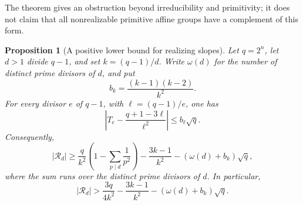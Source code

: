 \documentclass[11pt]{article}
\newtheorem{proposition}[theorem]{Proposition}
\begin{document}
The theorem gives an obstruction beyond irreducibility and
primitivity; it does not claim that all nonrealizable primitive
affine groups have a complement of this form.

\begin{proposition}[A positive lower bound for realizing slopes]
\label{prop:scalar-positive-bound}
Let $q=2^n$, let $d>1$ divide $q-1$, and set $k=(q-1)/d$.
Write $\omega(d)$ for the number of distinct prime divisors of $d$, and put
\[
 b_k=\frac{(k-1)(k-2)}{k^2}.
\]
For every divisor $e$ of $q-1$, with $\ell=(q-1)/e$, one has
\begin{equation}\label{eq:scalar-intersection-bound}
 \left|T_e-\frac{q+1-3\ell}{\ell^2}\right|
 \le b_\ell\sqrt q.
\end{equation}
Consequently,
\begin{equation}\label{eq:scalar-positive-bound}
 |\mathcal R_d|\ge
 \frac{q}{k^2}\left(1-\sum_{p\mid d}\frac1{p^2}\right)
 -\frac{3k-1}{k^2}-(\omega(d)+b_k)\sqrt q,
\end{equation}
where the sum runs over the distinct prime divisors of $d$. In particular,
\begin{equation}\label{eq:scalar-uniform-bound}
 |\mathcal R_d|>
 \frac{3q}{4k^2}-\frac{3k-1}{k^2}
 -(\omega(d)+b_k)\sqrt q.
\end{equation}
\end{proposition}
\end{document}
